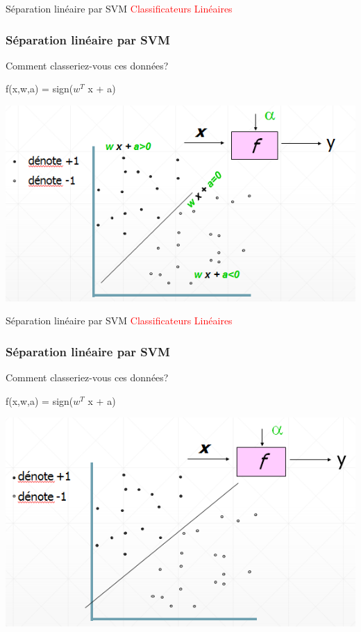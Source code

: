 \documentclass{bredelebeamer}
\begin{document}
\begin{frame}{Séparation linéaire par SVM}
\textcolor{red}{Classificateurs Linéaires}
 
    \frametitle{Séparation linéaire par SVM }
    \begin{minipage}{0.3\textwidth}
        Comment classeriez-vous ces données?\vspace{2\baselineskip}
        
        
        f(x,w,a) = sign($w^{T}$ x + a)
    \end{minipage}
    \begin{minipage}{0.3\textwidth}
        \includegraphics[scale=0.55]{5.png}
    \end{minipage}
\end{frame}

\begin{frame}{Séparation linéaire par SVM}
\textcolor{red}{Classificateurs Linéaires}
 
    \frametitle{Séparation linéaire par SVM }
    \begin{minipage}{0.3\textwidth}
        Comment classeriez-vous ces données?\vspace{2\baselineskip}
        
        
        f(x,w,a) = sign($w^{T}$ x + a)
    \end{minipage}
    \begin{minipage}{0.3\textwidth}
        \includegraphics[scale=0.55]{6.png}
    \end{minipage}
\end{frame}
\end{document}

